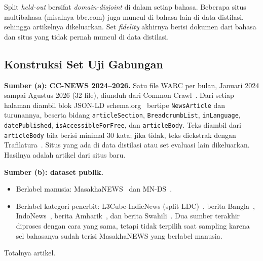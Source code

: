 \documentclass[journal]{IEEEtran}
\newcommand{\eng}[1]{\textit{#1}}   %
\begin{document}
Split \eng{held-out} bersifat \eng{domain-disjoint} di dalam setiap bahasa. Beberapa situs multibahasa (misalnya bbc.com) juga muncul di bahasa lain di data distilasi, sehingga artikelnya dikeluarkan. Set \eng{fidelity} akhirnya berisi  dokumen dari  bahasa dan  situs yang tidak pernah muncul di data distilasi.

\subsection{Konstruksi Set Uji Gabungan}
\label{sec:testset}
\textbf{Sumber (a): CC-NEWS 2024--2026.} Satu file WARC per bulan, Januari 2024 sampai Agustus 2026 (32 file), diunduh dari Common Crawl~\cite{commoncrawl2026ccnews}. Dari setiap halaman diambil blok JSON-LD schema.org~\cite{guha2016schema} bertipe \texttt{NewsArticle} dan turunannya, beserta bidang \texttt{articleSection}, \texttt{BreadcrumbList}, \texttt{inLanguage}, \texttt{datePublished}, \texttt{isAccessibleForFree}, dan \texttt{articleBody}. Teks diambil dari \texttt{articleBody} bila berisi minimal 30 kata; jika tidak, teks diekstrak dengan Trafilatura~\cite{barbaresi2021trafilatura}. Situs yang ada di data distilasi atau set evaluasi lain dikeluarkan. Hasilnya adalah  artikel dari situs baru.

\textbf{Sumber (b): dataset publik.}
\begin{itemize}
  \item Berlabel manusia: MasakhaNEWS~\cite{adelani2023masakhanews} dan MN-DS~\cite{petukhova2023mnds}.
  \item Berlabel kategori penerbit: L3Cube-IndicNews (split LDC)~\cite{mirashi2023indicnews}, berita Bangla~\cite{hossain2025banglanews}, IndoNews~\cite{indonews2021}, berita Amharik~\cite{amharicnews2024}, dan berita Swahili~\cite{swahilinews2020}. Dua sumber terakhir diproses dengan cara yang sama, tetapi tidak terpilih saat sampling karena sel bahasanya sudah terisi MasakhaNEWS yang berlabel manusia.
\end{itemize}
Totalnya  artikel.
\end{document}
